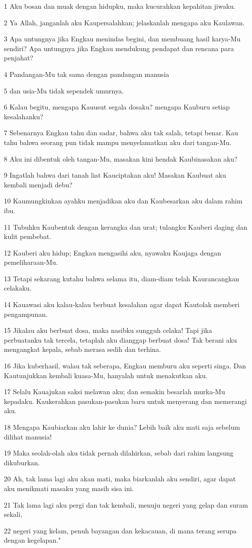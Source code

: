\par 1 Aku bosan dan muak dengan hidupku, maka kucurahkan kepahitan jiwaku.
\par 2 Ya Allah, janganlah aku Kaupersalahkan; jelaskanlah mengapa aku Kaulawan.
\par 3 Apa untungnya jika Engkau menindas begini, dan membuang hasil karya-Mu sendiri? Apa untungnya jika Engkau mendukung pendapat dan rencana para penjahat?
\par 4 Pandangan-Mu tak sama dengan pandangan manusia
\par 5 dan usia-Mu tidak sependek umurnya.
\par 6 Kalau begitu, mengapa Kauusut segala dosaku? mengapa Kauburu setiap kesalahanku?
\par 7 Sebenarnya Engkau tahu dan sadar, bahwa aku tak salah, tetapi benar. Kau tahu bahwa seorang pun tidak mampu menyelamatkan aku dari tangan-Mu.
\par 8 Aku ini dibentuk oleh tangan-Mu, masakan kini hendak Kaubinasakan aku?
\par 9 Ingatlah bahwa dari tanah liat Kauciptakan aku! Masakan Kaubuat aku kembali menjadi debu?
\par 10 Kaumungkinkan ayahku menjadikan aku dan Kaubesarkan aku dalam rahim ibu.
\par 11 Tubuhku Kaubentuk dengan kerangka dan urat; tulangku Kauberi daging dan kulit pembebat.
\par 12 Kauberi aku hidup; Engkau mengasihi aku, nyawaku Kaujaga dengan pemeliharaan-Mu.
\par 13 Tetapi sekarang kutahu bahwa selama itu, diam-diam telah Kaurancangkan celakaku.
\par 14 Kauawasi aku kalau-kalau berbuat kesalahan agar dapat Kautolak memberi pengampunan.
\par 15 Jikalau aku berbuat dosa, maka nasibku sungguh celaka! Tapi jika perbuatanku tak tercela, tetaplah aku dianggap berbuat dosa! Tak berani aku mengangkat kepala, sebab merasa sedih dan terhina.
\par 16 Jika kuberhasil, walau tak seberapa, Engkau memburu aku seperti singa. Dan Kautunjukkan kembali kuasa-Mu, hanyalah untuk menakutkan aku.
\par 17 Selalu Kauajukan saksi melawan aku; dan semakin besarlah murka-Mu kepadaku. Kaukerahkan pasukan-pasukan baru untuk menyerang dan memerangi aku.
\par 18 Mengapa Kaubiarkan aku lahir ke dunia? Lebih baik aku mati saja sebelum dilihat manusia!
\par 19 Maka seolah-olah aku tidak pernah dilahirkan, sebab dari rahim langsung dikuburkan.
\par 20 Ah, tak lama lagi aku akan mati, maka biarkanlah aku sendiri, agar dapat aku menikmati masaku yang masih sisa ini.
\par 21 Tak lama lagi aku pergi dan tak kembali, menuju negeri yang gelap dan suram sekali,
\par 22 negeri yang kelam, penuh bayangan dan kekacauan, di mana terang serupa dengan kegelapan."


